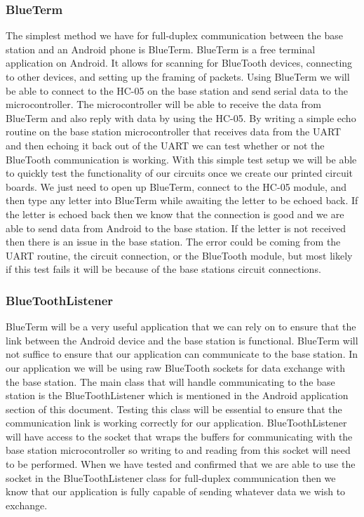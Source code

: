 \subsubsection{BlueTerm}
The simplest method we have for full{}-duplex communication between the base
station and an Android phone is BlueTerm.  BlueTerm is a free terminal
application on Android. It allows for scanning for BlueTooth devices,
connecting to other devices, and setting up the framing of packets. Using
BlueTerm we will be able to connect to the HC{}-05 on the base station and send
serial data to the microcontroller. The microcontroller will be able to receive
the data from BlueTerm and also reply with data by using the HC{}-05. By
writing a simple echo routine on the base station microcontroller that receives
data from the UART and then echoing it back out of the UART we can test whether
or not the BlueTooth communication is working. With this simple test setup we
will be able to quickly test the functionality of our circuits once we create
our printed circuit boards. We just need to open up BlueTerm, connect to the
HC{}-05 module, and then type any letter into BlueTerm while awaiting the
letter to be echoed back. If the letter is echoed back then we know that the
connection is good and we are able to send data from Android to the base
station. If the letter is not received then there is an issue in the base
station. The error could be coming from the UART routine, the circuit
connection, or the BlueTooth module, but most likely if this test fails it will
be because of the base stations circuit connections.

\subsubsection{BlueToothListener}
BlueTerm will be a very useful application that we can rely on to ensure that
the link between the Android device and the base station is functional.
BlueTerm will not suffice to ensure that our application can communicate to the
base station. In our application we will be using raw BlueTooth sockets for
data exchange with the base station. The main class that will handle
communicating to the base station is the BlueToothListener which is mentioned
in the Android application section of this document. Testing this class will be
essential to ensure that the communication link is working correctly for our
application. BlueToothListener will have access to the socket that wraps the
buffers for communicating with the base station microcontroller so writing to
and reading from this socket will need to be performed. When we have tested and
confirmed that we are able to use the socket in the BlueToothListener class for
full{}-duplex communication then we know that our application is fully capable
of sending whatever data we wish to exchange.

